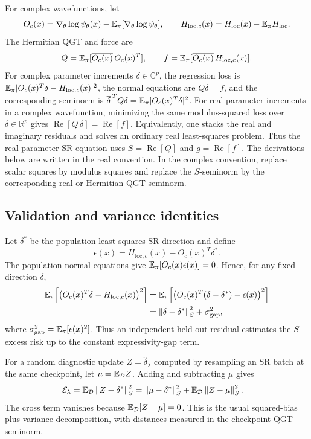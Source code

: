 For complex wavefunctions, let
\[
    O_c(x)=\nabla_\theta\log\psi_\theta(x)
    -\mathbb{E}_\pi[\nabla_\theta\log\psi_\theta],
    \qquad
    H_{\mathrm{loc},c}(x)=H_{\mathrm{loc}}(x)-\mathbb{E}_\pi H_{\mathrm{loc}} .
\]
The Hermitian QGT and force are
\[
    Q=\mathbb{E}_\pi[\overline{O_c(x)}\,O_c(x)^T],
    \qquad
    f=\mathbb{E}_\pi[\overline{O_c(x)}\,H_{\mathrm{loc},c}(x)] .
\]
For complex parameter increments \(\delta\in\mathbb C^p\), the regression loss is
\(\mathbb{E}_\pi|O_c(x)^T\delta-H_{\mathrm{loc},c}(x)|^2\), the normal equations are
\(Q\delta=f\), and the corresponding seminorm is
\(\overline{\delta}^{\,T}Q\delta=\mathbb{E}_\pi|O_c(x)^T\delta|^2\). For real parameter
increments in a complex wavefunction, minimizing the same modulus-squared loss
over \(\delta\in\mathbb R^p\) gives $\operatorname{Re}[Q\,\delta]=\operatorname{Re}[f].$
Equivalently, one stacks the real and imaginary residuals and solves an ordinary
real least-squares problem. Thus the real-parameter SR equation uses
\(S=\operatorname{Re}[Q]\) and \(g=\operatorname{Re}[f]\). The derivations below are
written in the real convention. In the complex convention, replace scalar
squares by modulus squares and replace the \(S\)-seminorm by the corresponding
real or Hermitian QGT seminorm.

\subsection{Validation and variance identities}

Let \(\delta^*\) be the population least-squares SR direction and define
\[
    \epsilon(x)=H_{\mathrm{loc},c}(x)-O_c(x)^T\delta^* .
\]
The population normal equations give
\(\mathbb{E}_\pi[O_c(x)\epsilon(x)]=0\). Hence, for any fixed direction
\(\delta\),
\[
\begin{aligned}
    \mathbb{E}_\pi\!\left[
        \left(O_c(x)^T\delta-H_{\mathrm{loc},c}(x)\right)^2
    \right]
    &=
    \mathbb{E}_\pi\!\left[
        \left(O_c(x)^T(\delta-\delta^*)-\epsilon(x)\right)^2
    \right] \\
    &=
    \left\| \delta-\delta^* \right\|_S^2
    +\sigma_{\mathrm{gap}}^2,
\end{aligned}
\]
where \(\sigma_{\mathrm{gap}}^2=\mathbb{E}_\pi[\epsilon(x)^2]\). Thus an
independent held-out residual estimates the \(S\)-excess risk up to the constant
expressivity-gap term.

For a random diagnostic update \(Z=\hat\delta_\lambda\) computed by resampling
an SR batch at the same checkpoint, let \(\mu=\mathbb{E}_{\mathcal D}Z\). Adding and
subtracting \(\mu\) gives
\[
\begin{aligned}
    \mathcal E_\lambda
    =
    \mathbb{E}_{\mathcal D}\left\| Z-\delta^* \right\|_S^2
    &=
    \left\| \mu-\delta^* \right\|_S^2
    +
    \mathbb{E}_{\mathcal D}\left\| Z-\mu \right\|_S^2 .
\end{aligned}
\]
The cross term vanishes because \(\mathbb{E}_{\mathcal D}[Z-\mu]=0\). This is the
usual squared-bias plus variance decomposition, with distances measured in the
checkpoint QGT seminorm.

